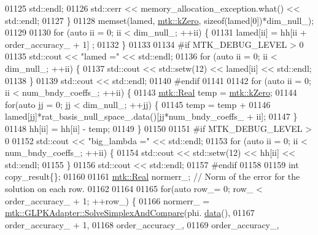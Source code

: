 \begin{DoxyCode}
{{01125         std::endl;
01126       std::cerr << memory\_allocation\_exception.what() << std::endl;
01127     \}
01128     memset(lamed, \hyperlink{group__c01-roots_ga59a451a5fae30d59649bcda274fea271}{mtk::kZero}, \textcolor{keyword}{sizeof}(lamed[0])*dim\_null\_);
01129 
01130     \textcolor{keywordflow}{for} (\textcolor{keyword}{auto} ii = 0; ii < dim\_null\_; ++ii) \{
01131       lamed[ii] = hh[ii + order\_accuracy\_ + 1] ;
01132     \}
01133 
01134 \textcolor{preprocessor}{    #if MTK\_DEBUG\_LEVEL > 0}
01135     std::cout << \textcolor{stringliteral}{"lamed ="} << std::endl;
01136     \textcolor{keywordflow}{for} (\textcolor{keyword}{auto} ii = 0; ii < dim\_null\_; ++ii) \{
01137       std::cout << std::setw(12) << lamed[ii] << std::endl;
01138     \}
01139     std::cout << std::endl;
01140 \textcolor{preprocessor}{    #endif}
01141 
01142     \textcolor{keywordflow}{for} (\textcolor{keyword}{auto} ii = 0; ii < num\_bndy\_coeffs\_; ++ii) \{
01143       \hyperlink{group__c01-roots_gac080bbbf5cbb5502c9f00405f894857d}{mtk::Real} temp = \hyperlink{group__c01-roots_ga59a451a5fae30d59649bcda274fea271}{mtk::kZero};
01144       \textcolor{keywordflow}{for}(\textcolor{keyword}{auto} jj = 0; jj < dim\_null\_; ++jj) \{
01145         temp = temp +
01146           lamed[jj]*rat\_basis\_null\_space\_.data()[jj*num\_bndy\_coeffs\_ + ii];
01147       \}
01148       hh[ii] = hh[ii] - temp;
01149     \}
01150 
01151 \textcolor{preprocessor}{    #if MTK\_DEBUG\_LEVEL > 0}
01152     std::cout << \textcolor{stringliteral}{"big\_lambda ="} << std::endl;
01153     \textcolor{keywordflow}{for} (\textcolor{keyword}{auto} ii = 0; ii < num\_bndy\_coeffs\_; ++ii) \{
01154       std::cout << std::setw(12) << hh[ii] << std::endl;
01155     \}
01156     std::cout << std::endl;
01157 \textcolor{preprocessor}{    #endif}
01158 
01159     \textcolor{keywordtype}{int} copy\_result\{\};
01160 
01161     \hyperlink{group__c01-roots_gac080bbbf5cbb5502c9f00405f894857d}{mtk::Real} normerr\_; \textcolor{comment}{// Norm of the error for the solution on each row.}
01162 
01164 
01165     \textcolor{keywordflow}{for}(\textcolor{keyword}{auto} row\_= 0; row\_ < order\_accuracy\_ + 1; ++row\_) \{
01166       normerr\_ = \hyperlink{classmtk_1_1GLPKAdapter_a834480aca83e3c0d09fdab7fdb7e8a3f}{mtk::GLPKAdapter::SolveSimplexAndCompare}(phi.
      \hyperlink{classmtk_1_1DenseMatrix_a0c33b8a9e01d157c61ddbdf807c25d84}{data}(),
01167                                                           order\_accuracy\_ + 1,
01168                                                           order\_accuracy\_,
01169                                                           order\_accuracy\_,
}}
\end{DoxyCode}
